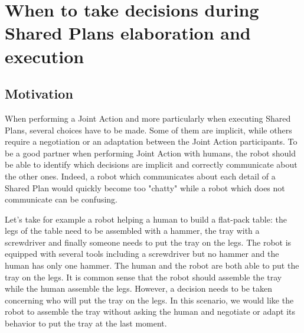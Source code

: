 \documentclass[english,a4paper,11pt,twoside]{StyleThese}
\begin{document}
\setcounter{chapter}{4} %
\dominitoc
\faketableofcontents
\fi

\chapter{When to take decisions during Shared Plans elaboration and execution}
\minitoc

\label{ch:SP}

\section{Motivation}

When performing a Joint Action and more particularly when executing Shared Plans, several choices have to be made. Some of them are implicit, while others require a negotiation or an adaptation between the Joint Action participants. To be a good partner when performing Joint Action with humans, the robot should be able to identify which decisions are implicit and correctly communicate about the other ones. Indeed, a robot which communicates about each detail of a Shared Plan would quickly become too "chatty" while a robot which does not communicate can be confusing.

Let's take for example a robot helping a human to build a flat-pack table: the legs of the table need to be assembled with a hammer, the tray with a screwdriver and finally someone needs to put the tray on the legs. The robot is equipped with several tools including a screwdriver but no hammer and the human has only one hammer. The human and the robot are both able to put the tray on the legs. It is common sense that the robot should assemble the tray while the human assemble the legs. However, a decision needs to be taken concerning who will put the tray on the legs. 
In this scenario, we would like the robot to assemble the tray without asking the human and negotiate or adapt its behavior to put the tray at the last moment. 
\end{document}
